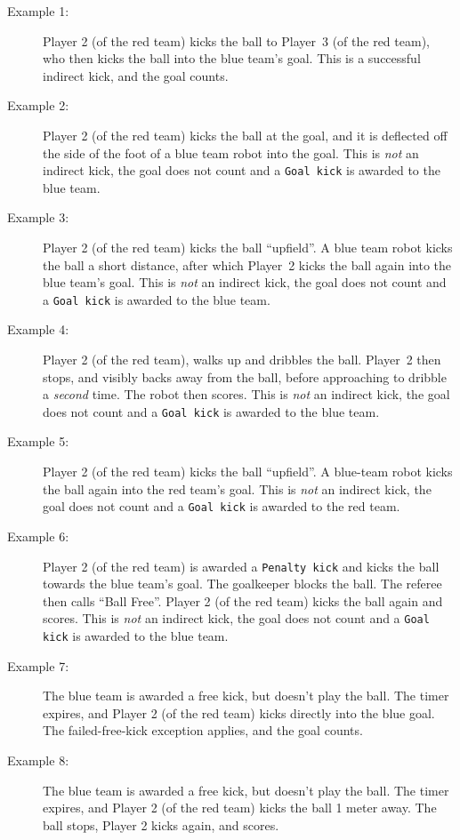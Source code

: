 \begin{description}
  \item[Example 1:] Player 2 (of the red team) kicks the ball to Player~3 (of the red team), who then kicks the ball into the blue team's goal.
  This is a successful indirect kick, and the goal counts.
  \item[Example 2:] Player 2 (of the red team) kicks the ball at the goal, and it is deflected off the side of the foot of a blue team robot into the goal.
    This is \textit{not} an indirect kick, the goal does not count and a \texttt{Goal kick} is awarded to the blue team.
  \item[Example 3:] Player 2 (of the red team) kicks the ball ``upfield''.
    A blue team robot kicks the ball a short distance, after which Player~2 kicks the ball again into the blue team's goal.
    This is \textit{not} an indirect kick, the goal does not count and a \texttt{Goal kick} is awarded to the blue team.
  \item[Example 4:] Player 2 (of the red team), walks up and dribbles the ball.
    Player~2 then stops, and visibly backs away from the ball, before approaching to dribble a \textit{second} time. The robot then scores.
    This is \textit{not} an indirect kick, the goal does not count and a \texttt{Goal kick} is awarded to the blue team.
  \item[Example 5:] Player 2 (of the red team) kicks the ball ``upfield''.
  A blue-team robot kicks the ball again into the red team's goal.
  This is \textit{not} an indirect kick, the goal does not count and a \texttt{Goal kick} is awarded to the red team.
  \item[Example 6:] Player 2 (of the red team) is awarded a \texttt{Penalty kick} and kicks the ball towards the blue team's goal. The goalkeeper blocks the ball. The referee then calls ``Ball Free''.
  Player 2 (of the red team) kicks the ball again and scores.
  This is \textit{not} an indirect kick, the goal does not count and a \texttt{Goal kick} is awarded to the blue team.
  \item[Example 7:] The blue team is awarded a free kick, but doesn't play the ball. The timer expires, and Player 2 (of the red team) kicks directly into the blue goal.
  The failed-free-kick exception applies, and the goal counts.
  \item[Example 8:] The blue team is awarded a free kick, but doesn't play the ball. The timer expires, and Player 2 (of the red team) kicks the ball 1 meter away.
  The ball stops, Player 2 kicks again, and scores.

\end{description}
